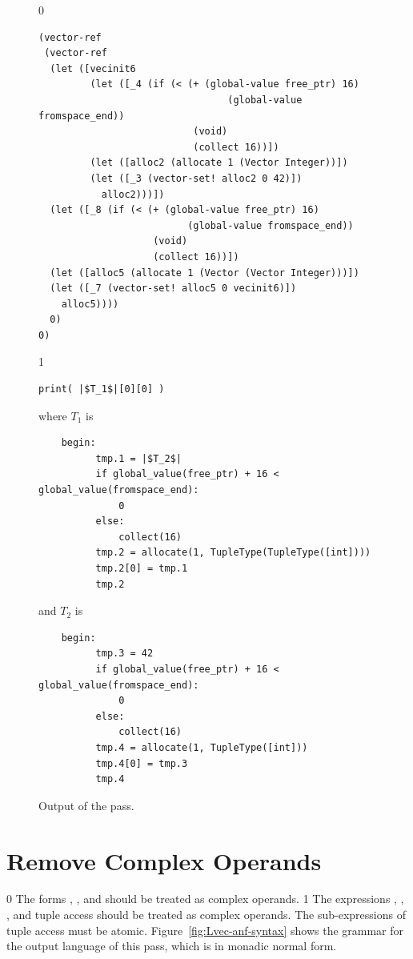 \documentclass[7x10]{TimesAPriori_MIT}%
\def\racketEd{0}
\def\pythonEd{1}
\def\edition{1}
\newcommand{\pythonColor}[0]{}
\numberwithin{theorem}{chapter}
\numberwithin{definition}{chapter}
\numberwithin{equation}{chapter}
\begin{document}
\begin{figure}[tbp]
  \begin{tcolorbox}[colback=white]
{\if\edition\racketEd
\begin{lstlisting}
(vector-ref
 (vector-ref
  (let ([vecinit6
         (let ([_4 (if (< (+ (global-value free_ptr) 16)
                                 (global-value fromspace_end))
                           (void)
                           (collect 16))])
         (let ([alloc2 (allocate 1 (Vector Integer))])
         (let ([_3 (vector-set! alloc2 0 42)])
           alloc2)))])
  (let ([_8 (if (< (+ (global-value free_ptr) 16)
                          (global-value fromspace_end))
                    (void)
                    (collect 16))])
  (let ([alloc5 (allocate 1 (Vector (Vector Integer)))])
  (let ([_7 (vector-set! alloc5 0 vecinit6)])
    alloc5))))
  0)
0)
\end{lstlisting}
\fi}
{\if\edition\pythonEd\pythonColor
\begin{lstlisting}
print( |$T_1$|[0][0] )
\end{lstlisting}
where $T_1$ is
\begin{lstlisting}
    begin:
          tmp.1 = |$T_2$|
          if global_value(free_ptr) + 16 < global_value(fromspace_end):
              0
          else:
              collect(16)
          tmp.2 = allocate(1, TupleType(TupleType([int])))
          tmp.2[0] = tmp.1
          tmp.2
\end{lstlisting}
and $T_2$ is
\begin{lstlisting}
    begin:
          tmp.3 = 42
          if global_value(free_ptr) + 16 < global_value(fromspace_end):
              0
          else:
              collect(16)
          tmp.4 = allocate(1, TupleType([int]))
          tmp.4[0] = tmp.3
          tmp.4
\end{lstlisting}
\fi}
  \end{tcolorbox}
\caption{Output of the  pass.}
\label{fig:expose-alloc-output}
\end{figure}


\section{Remove Complex Operands}
\label{sec:remove-complex-opera-Lvec}

{\if\edition\racketEd
%
The forms , , and 
should be treated as complex operands.
%
\fi}
%
{\if\edition\pythonEd\pythonColor
%
The expressions , , ,
and tuple access should be treated as complex operands.  The
sub-expressions of tuple access must be atomic.
%
\fi}
Figure~\ref{fig:Lvec-anf-syntax}
shows the grammar for the output language \LangAllocANF{} of this
pass, which is \LangAlloc{} in monadic normal form.
\end{document}
